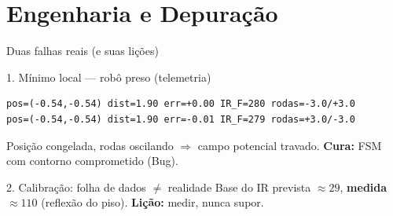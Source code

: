 \documentclass[aspectratio=169,11pt]{beamer}
\begin{document}
\section{Engenharia e Depuração}
\begin{frame}[fragile]{Duas falhas reais (e suas lições)}
\begin{block}{1. Mínimo local --- robô preso (telemetria)}
\begin{lstlisting}
pos=(-0.54,-0.54) dist=1.90 err=+0.00 IR_F=280 rodas=-3.0/+3.0
pos=(-0.54,-0.54) dist=1.90 err=-0.01 IR_F=279 rodas=+3.0/-3.0
\end{lstlisting}
\footnotesize Posição congelada, rodas oscilando $\Rightarrow$ campo potencial travado. \textbf{Cura:} FSM com contorno comprometido (Bug).
\end{block}
\begin{block}{2. Calibração: folha de dados $\neq$ realidade}
\footnotesize Base do IR prevista $\approx 29$, \textbf{medida $\approx 110$} (reflexão do piso). \textbf{Lição:} medir, nunca supor.
\end{block}
\end{frame}

\end{document}
